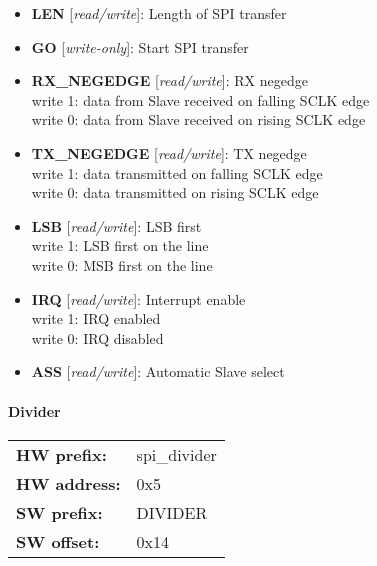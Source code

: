 \begin{itemize}
\item \begin{small}
{\bf 
LEN
} [\emph{read/write}]: Length of SPI transfer
\end{small}
\item \begin{small}
{\bf 
GO
} [\emph{write-only}]: Start SPI transfer
\end{small}
\item \begin{small}
{\bf 
RX\_NEGEDGE
} [\emph{read/write}]: RX negedge
\\
write 1: data from Slave received on falling SCLK edge \\                     write 0: data from Slave received on rising SCLK edge
\end{small}
\item \begin{small}
{\bf 
TX\_NEGEDGE
} [\emph{read/write}]: TX negedge
\\
write 1: data transmitted on falling SCLK edge \\                     write 0: data transmitted on rising SCLK edge
\end{small}
\item \begin{small}
{\bf 
LSB
} [\emph{read/write}]: LSB first
\\
write 1: LSB first on the line \\                     write 0: MSB first on the line
\end{small}
\item \begin{small}
{\bf 
IRQ
} [\emph{read/write}]: Interrupt enable
\\
write 1: IRQ enabled \\                     write 0: IRQ disabled
\end{small}
\item \begin{small}
{\bf 
ASS
} [\emph{read/write}]: Automatic Slave select
\end{small}
\end{itemize}
\paragraph*{Divider}\vspace{12pt}

\begin{tabular}{l l }
{\bf HW prefix:}  & spi\_divider\\
{\bf HW address:}  & 0x5\\
{\bf SW prefix:}  & DIVIDER\\
{\bf SW offset:}  & 0x14\\
\end{tabular}

